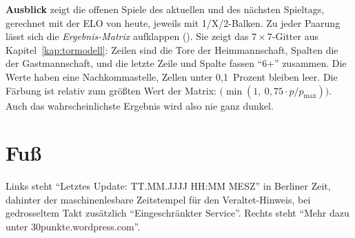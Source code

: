 \textbf{Ausblick} zeigt die offenen Spiele des aktuellen und des nächsten
Spieltags, gerechnet mit der ELO von heute, jeweils mit 1/X/2-Balken. Zu
jeder Paarung lässt sich die \emph{Ergebnis-Matrix} aufklappen
(). Sie zeigt das $7\times7$-Gitter aus
Kapitel~\ref{kap:tormodell}: Zeilen sind die Tore der Heimmannschaft, Spalten
die der Gastmannschaft, und die letzte Zeile und Spalte fassen \enquote{6+}
zusammen. Die Werte haben eine Nachkommastelle, Zellen unter 0{,}1~Prozent
bleiben leer. Die Färbung ist relativ zum größten Wert der Matrix:
$\bigl(\min(1,\ 0{,}75 \cdot p / p_{\max})\bigr)$. Auch
das wahrscheinlichste Ergebnis wird also nie ganz dunkel.

\section{Fuß}

Links steht \enquote{Letztes Update: TT.MM.JJJJ HH:MM MESZ} in Berliner Zeit,
dahinter der maschinenlesbare Zeitstempel für den Veraltet-Hinweis, bei
gedrosseltem Takt zusätzlich \enquote{Eingeschränkter Service}. Rechts steht
\enquote{Mehr dazu unter 30punkte.wordpress.com}.
